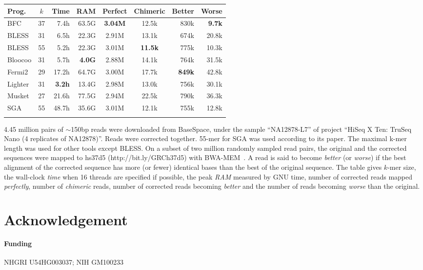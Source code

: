 \documentclass{bioinfo}
\begin{document}
\begin{table}[ht]
{\footnotesize
\begin{tabular}{lcrrccrr}
\toprule
Prog.     & $k$ & Time & RAM   & Perfect & Chimeric & Better & Worse \\
\midrule
BFC       & 37    & 7.4h & 63.5G &{\bf 3.04M}& 12.5k  & 830k   &{\bf 9.7k} \\
BLESS     & 31    & 6.5h & 22.3G & 2.91M   & 13.1k    & 674k   & 20.8k  \\
BLESS     & 55    & 5.2h & 22.3G & 3.01M  &{\bf 11.5k}& 775k   & 10.3k  \\
Bloocoo   & 31    &5.7h&{\bf 4.0G}& 2.88M  & 14.1k    & 764k   & 31.5k  \\
Fermi2    & 29    &17.2h & 64.7G & 3.00M   & 17.7k    &{\bf 849k}&42.8k \\
Lighter   & 31    &{\bf 3.2h}& 13.4G&2.98M & 13.0k    & 756k   & 30.1k  \\
Musket    & 27    &21.6h & 77.5G & 2.94M   & 22.5k    & 790k   & 36.3k  \\
SGA       & 55    &48.7h & 35.6G & 3.01M   & 12.1k    & 755k   & 12.8k  \\
\botrule
\end{tabular}}{4.45 million pairs of $\sim$150bp reads were
downloaded from BaseSpace, under the sample ``NA12878-L7'' of project
``HiSeq X Ten: TruSeq Nano (4 replicates of NA12878)''. Reads were corrected
together. 55-mer for SGA was used according to its paper. The maximal k-mer
length was used for other tools except BLESS. On a subset of two million
randomly sampled read pairs, the original and the corrected sequences were
mapped to hs37d5 (http://bit.ly/GRCh37d5) with BWA-MEM~\citep{Li:2013aa}. A
read is said to become \emph{better} (or \emph{worse}) if the best alignment of
the corrected sequence has more (or fewer) identical bases than the best of the
original sequence. The table gives $k$-mer size, the wall-clock \emph{time} when 16 threads
are specified if possible, the peak \emph{RAM} measured by GNU time, number of
corrected reads mapped \emph{perfectly}, number of \emph{chimeric} reads,
number of corrected reads becoming \emph{better} and the number of reads
becoming \emph{worse} than the original.}

\end{table}

\section*{Acknowledgement}
\paragraph{Funding\textcolon} NHGRI U54HG003037; NIH GM100233


\end{document}
